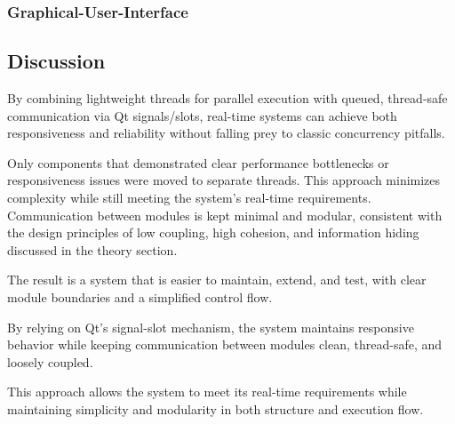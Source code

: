 \subsubsection{Graphical-User-Interface}








\subsection{Discussion}


By combining lightweight threads for parallel execution with queued, thread-safe communication via Qt signals/slots, real-time systems can achieve both responsiveness and reliability without falling prey to classic concurrency pitfalls.

Only components that demonstrated clear performance bottlenecks or responsiveness issues were moved to separate threads. This approach minimizes complexity while still meeting the system’s real-time requirements. Communication between modules is kept minimal and modular, consistent with the design principles of low coupling, high cohesion, and information hiding discussed in the theory section.

The result is a system that is easier to maintain, extend, and test, with clear module boundaries and a simplified control flow.

By relying on Qt’s signal-slot mechanism, the system maintains responsive behavior while keeping communication between modules clean, thread-safe, and loosely coupled.

This approach allows the system to meet its real-time requirements while maintaining simplicity and modularity in both structure and execution flow.


